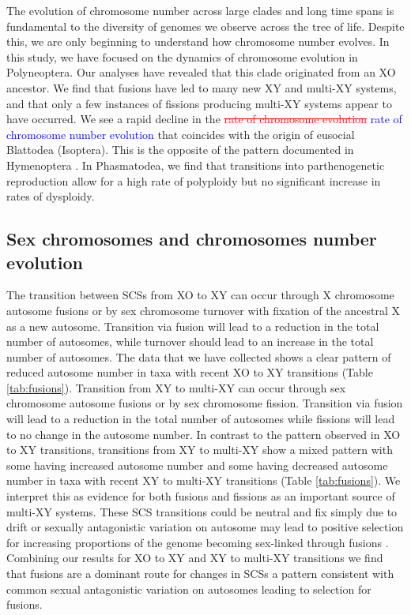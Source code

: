 \documentclass[]{rsos}%
\begin{document}
The evolution of chromosome number across large clades and long time spans is fundamental to the diversity of genomes we observe across the tree of life.
Despite this, we are only beginning to understand how chromosome number evolves.
In this study, we have focused on the dynamics of chromosome evolution in Polyneoptera. 
Our analyses have revealed that this clade originated from an XO ancestor. 
We find that fusions have led to many new XY and multi-XY systems, and that only a few instances of fissions producing multi-XY systems appear to have occurred.
We see a rapid decline in the \textcolor{red}{\st{rate of chromosome evolution}} \textcolor{blue}{rate of chromosome number evolution} that coincides with the origin of eusocial Blattodea (Isoptera).
This is the opposite of the pattern documented in Hymenoptera \cite{ross2015}.
In Phasmatodea, we find that transitions into parthenogenetic reproduction allow for a high rate of polyploidy but no significant increase in rates of dysploidy.

\subsection{Sex chromosomes and chromosomes number evolution}
The transition between SCSs from XO to XY can occur through X chromosome autosome fusions or by sex chromosome turnover with fixation of the ancestral X as a new autosome.
Transition via fusion will lead to a reduction in the total number of autosomes, while turnover should lead to an increase in the total number of autosomes.
The data that we have collected shows a clear pattern of reduced autosome number in taxa with recent XO to XY transitions (Table \ref{tab:fusions}).
Transition from XY to multi-XY can occur through sex chromosome autosome fusions or by sex chromosome fission.
Transition via fusion will lead to a reduction in the total number of autosomes while fissions will lead to no change in the autosome number.
In contrast to the pattern observed in XO to XY transitions, transitions from XY to multi-XY show a mixed pattern with some having increased autosome number and some having decreased autosome number in taxa with recent XY to multi-XY transitions (Table \ref{tab:fusions}).
We interpret this as evidence for both fusions and fissions as an important source of multi-XY systems.
These SCS transitions could be neutral and fix simply due to drift or sexually antagonistic variation on autosome may lead to positive selection for increasing proportions of the genome becoming sex-linked through fusions \cite{charlesworth1980, kitano2012}.
Combining our results for XO to XY and XY to multi-XY transitions we find that fusions are a dominant route for changes in SCSs a pattern consistent with common sexual antagonistic variation on autosomes leading to selection for fusions. 
\end{document}
